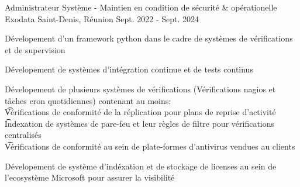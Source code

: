 
\begin{cventries}
  \cventry
    {Administrateur Système - Maintien en condition de sécurité \& opérationelle}
    {Exodata}
    {Saint-Denis, Réunion}
    {Sept. 2022 - Sept. 2024}
    {
      \begin{cvitems}
       \item{Dévelopement d'un framework python dans le cadre de systèmes de vérifications et de supervision}
       \item{Dévelopement de systèmes d'intégration continue et de tests continus}
       \item{
        Dévelopement de plusieurs systèmes de vérifications (Vérifications nagios et tâches cron quotidiennes) contenant au moins: \\
        \t  * Vérifications de conformité de la réplication pour plans de reprise d'activité \\
        \t  * Indexation de systèmes de pare-feu et leur règles de filtre pour vérifications centralisés \\
        \t  * Vérifications de conformité au sein de plate-formes d'antivirus vendues au clients
        }
        \item{Dévelopement de système d'indéxation et de stockage de licenses au sein de l'ecosystème Microsoft pour assurer la visibilité}
      \end{cvitems}
    }
\end{cventries}
